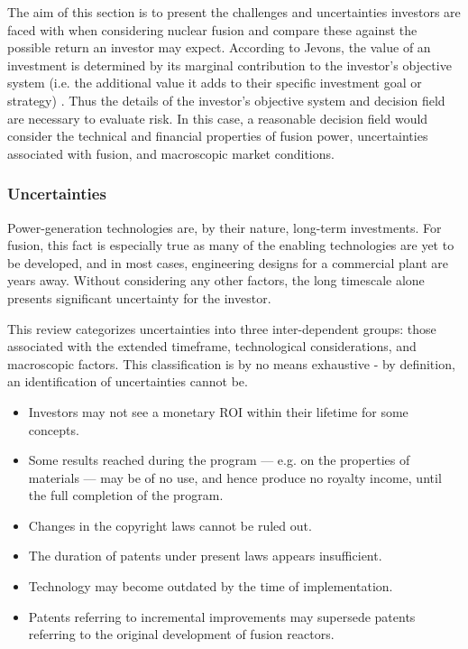 The aim of this section is to present the challenges and uncertainties investors are faced with when considering nuclear fusion and compare these against the possible return an investor may expect. According to Jevons,  the value of an investment is determined by its marginal contribution to the investor’s objective system (i.e. the additional value it adds to their specific investment goal or strategy) \cite{jevons1879theory}. Thus the details of the investor’s objective system and decision field are necessary to evaluate risk. In this case, a reasonable decision field would consider the technical and financial properties of fusion power, uncertainties associated with fusion, and macroscopic market conditions. 

\subsubsection{Uncertainties}

Power-generation technologies are, by their nature, long-term investments. For fusion, this fact is especially true as many of the enabling technologies are yet to be developed, and in most cases, engineering designs for a commercial plant are years away. Without considering any other factors, the long timescale alone presents significant uncertainty for the investor. 

This review categorizes uncertainties into three inter-dependent groups: those associated with the extended timeframe, technological considerations, and macroscopic factors. This classification is by no means exhaustive - by definition, an identification of uncertainties cannot be.

\begin{itemize}
\item Investors may not see a monetary ROI within their lifetime for some concepts.
 \item Some results reached during the program — e.g. on the properties of materials — may be of no use, and hence produce no royalty income, until the full completion of the program.
 \item Changes in the copyright laws cannot be ruled out.
 \item The duration of patents under present laws appears insufficient.
 \item Technology may become outdated by the time of implementation.
 \item Patents referring to incremental improvements may supersede patents referring to the original development of fusion reactors.
\end{itemize}


